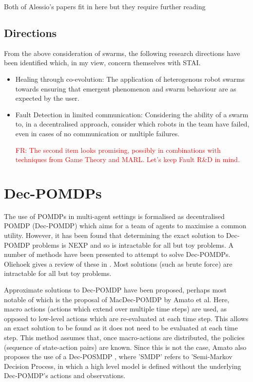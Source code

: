 \documentclass[preprint,11pt]{report}
\newcommand\fr[1]{\textcolor{red}{FR: #1}}
\begin{document}
Both of Alessio's papers \cite{Kouvaros2019FormalSystems, Lomuscio2019ASystems} fit in here but they
require further reading

\subsection{Directions}

From the above consideration of swarms, the following research
directions have been identified which, in my view, concern themselves
with STAI.

\begin{itemize} \item Healing through co-evolution: The application of heterogenous robot swarms
towards ensuring that emergent phenomenon and swarm behaviour are as
expected by the user.


\item Fault Detection in limited communication:
Considering the ability of a swarm to, in a decentralised approach,
consider which robots in the team have failed, even in cases of no
communication or multiple failures.

\fr{The second item looks promising, possibly in combinations with
  techniques from Game Theory and MARL. Let's keep Fault R\&D in
  mind.}


\end{itemize}

\section{Dec-POMDPs}

The use of POMDPs in multi-agent settings is formalised as
decentralised POMDP (Dec-POMDP) which aims for a team of agents to
maximise a common utility. However, it has been found that determining
the exact solution to Dec-POMDP problems is NEXP \cite{Eker2011} and
so is intractable for all but toy problems. A number of methods have
been presented to attempt to solve Dec-POMDPs. Oliehoek gives a review
of these in \cite{OliehoekDecentralizedPOMDPs}. Most solutions (such
as brute force) are intractable for all but toy problems.

Approximate solutions to Dec-POMDP have been proposed, perhaps most
notable of which is the proposal of MacDec-POMDP \cite{Amato2015} by
Amato et al. Here, macro actions (actions which extend over multiple
time steps) are used, as opposed to low-level actions which are
re-evaluated at each time step. This allows an exact solution to be
found as it does not need to be evaluated at each time step. This
method assumes that, once macro-actions are distributed, the policies
(sequence of state-action pairs) are known. Since this is not the
case, Amato also proposes the use of a Dec-POSMDP
\cite{Amato2017Decision-MakingLearning}, where 'SMDP' refers to
'Semi-Markov Decision Process, in which a high level model is defined
without the underlying Dec-POMDP's actions and observations.
\end{document}

